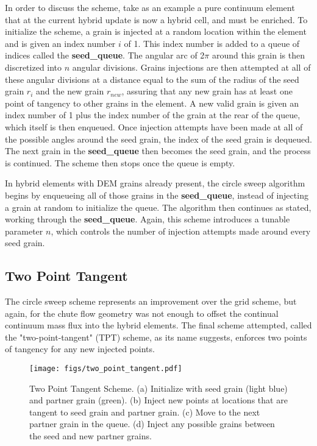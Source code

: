 In order to discuss the scheme, take as an example a pure continuum element that at the current hybrid update is now a hybrid cell, and must be enriched. To initialize the scheme, a grain is injected at a random location within the element and is given an index number $i$ of 1. This index number is added to a queue of indices called the \textbf{seed\_queue}. The angular arc of 2$\pi$ around this grain is then discretized into $n$ angular divisions. Grains injections are then attempted at all of these angular divisions at a distance equal to the sum of the radius of the seed grain $r_i$ and the new grain $r_{new}$, assuring that any new grain has at least one point of tangency to other grains in the element. A new valid grain is given an index number of 1 plus the index number of the grain at the rear of the queue, which itself is then enqueued. Once injection attempts have been made at all of the possible angles around the seed grain, the index of the seed grain is dequeued. The next grain in the \textbf{seed\_queue} then becomes the seed grain, and the process is continued. The scheme then stops once the queue is empty.

In hybrid elements with DEM grains already present, the circle sweep algorithm begins by enqueueing all of those grains in the \textbf{seed\_queue}, instead of injecting a grain at random to initialize the queue. The algorithm then continues as stated, working through the \textbf{seed\_queue}. Again, this scheme introduces a tunable parameter $n$, which controls the number of injection attempts made around every seed grain.

\subsection{Two Point Tangent}
The circle sweep scheme represents an improvement over the grid scheme, but again, for the chute flow geometry was not enough to offset the continual continuum mass flux into the hybrid elements. The final scheme attempted, called the "two-point-tangent" (TPT) scheme, as its name suggests, enforces two points of tangency for any new injected points. 

\begin{figure}[htp] 
    \centering
    \texttt{[image: figs/two\_point\_tangent.pdf]}
    \caption{Two Point Tangent Scheme. (a) Initialize with seed grain (light blue) and  partner grain (green). (b) Inject new points at locations that are tangent to seed grain and partner grain. (c) Move to the next partner grain in the queue. (d) Inject any possible grains between the seed and new partner grains.}
    \label{two_tangent_enrichment}
\end{figure}

